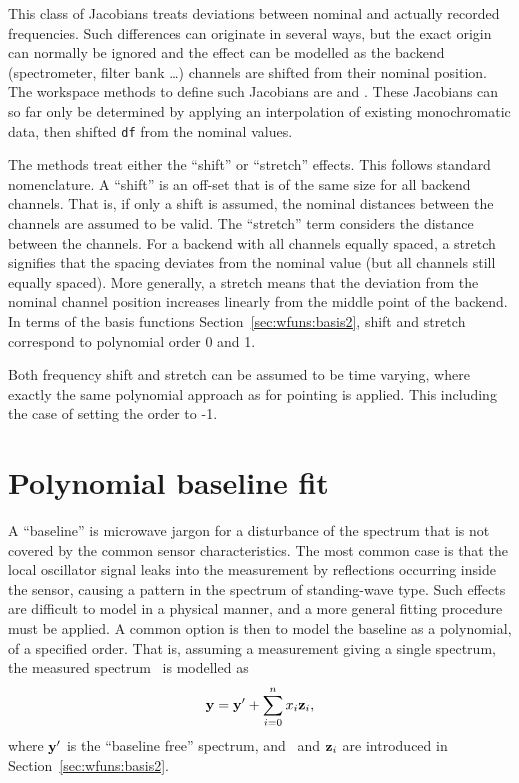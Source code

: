 This class of Jacobians treats deviations between nominal and actually recorded
frequencies. Such differences can originate in several ways, but the exact
origin can normally be ignored and the effect can be modelled as the backend
(spectrometer, filter bank \dots) channels are shifted from their nominal
position. The workspace methods to define such Jacobians are
 and . These
Jacobians can so far only be determined by applying an interpolation of existing
monochromatic data, then shifted \verb|df| from the nominal
values.

The methods treat either the ``shift'' or ``stretch'' effects. This follows
standard nomenclature. A ``shift'' is an off-set that is of the same size for
all backend channels. That is, if only a shift is assumed, the nominal
distances between the channels are assumed to be valid. The ``stretch'' term
considers the distance between the channels. For a backend with all channels
equally spaced, a stretch signifies that the spacing deviates from the nominal
value (but all channels still equally spaced). More generally, a stretch means
that the deviation from the nominal channel position increases linearly from
the middle point of the backend. In terms of the basis functions
Section~\ref{sec:wfuns:basis2}, shift and stretch correspond to polynomial
order 0 and 1.

Both frequency shift and stretch can be assumed to be time varying, where
exactly the same polynomial approach as for pointing is applied. This
including the case of setting the order to -1.




\section{Polynomial baseline fit}
\label{sec:wfuns:polyfit}

A ``baseline'' is microwave jargon for a disturbance of the spectrum that is
not covered by the common sensor characteristics. The most common case is that
the local oscillator signal leaks into the measurement by reflections occurring
inside the sensor, causing a pattern in the spectrum of standing-wave type.
Such effects are difficult to model in a physical manner, and a more general
fitting procedure must be applied. A common option is then to model the
baseline as a polynomial, of a specified order. That is, assuming a measurement
giving a single spectrum, the measured spectrum \MsrVct\ is modelled as
\begin{equation}
  \label{eq:polyfit}
  \mathbf{y} = \mathbf{y}' + \sum_{i=0}^n x_{i}\mathbf{z}_i,
\end{equation}
where $\mathbf{y}'$ is the ``baseline free'' spectrum, and \ and
$\mathbf{z}_i$ are introduced in Section~\ref{sec:wfuns:basis2}.

